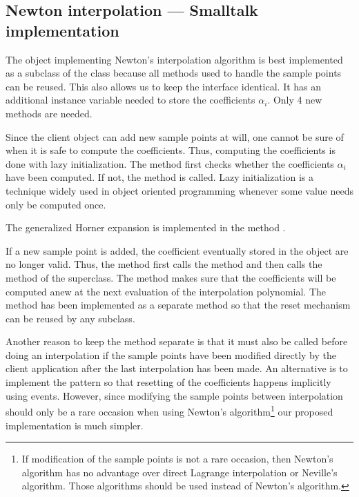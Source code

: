 \subsection{Newton interpolation --- Smalltalk implementation}
The object implementing Newton's interpolation algorithm is best implemented as a subclass of the
class  because all methods used to
handle the sample points can be reused. This also allows us to
keep the interface identical. It has an additional instance
variable needed to store the coefficients $\alpha_i$. Only 4 new
methods are needed.

Since the client object can add new sample points at will, one
cannot be sure of when it is safe to compute the coefficients.
Thus, computing the coefficients is done with lazy initialization.
The method  first checks whether the coefficients
$\alpha_i$ have been computed. If not, the method  is called. Lazy initialization is a technique
widely used in object oriented programming whenever some value
needs only be computed once.

\noindent The generalized Horner expansion is implemented in the
method .

If a new sample point is added, the coefficient eventually stored
in the object are no longer valid. Thus, the method 
first calls the method  and then calls the
method  of the superclass. The method  makes sure that the coefficients will be
computed anew at the next evaluation of the interpolation
polynomial. The method  has been
implemented as a separate method so that the reset mechanism can
be reused by any subclass.

Another reason to keep the method  separate
is that it must also be called before doing an interpolation if
the sample points have been modified directly by the client
application after the last interpolation has been made. An
alternative is to implement the 
pattern so that resetting of the coefficients happens implicitly
using events. However, since modifying the sample points between
interpolation should only be a rare occasion when using Newton's
algorithm\footnote{If modification of the sample points is not a
rare occasion, then Newton's algorithm has no advantage over
direct Lagrange interpolation or Neville's algorithm. Those
algorithms should be used instead of Newton's algorithm.} our
proposed implementation is much simpler.

